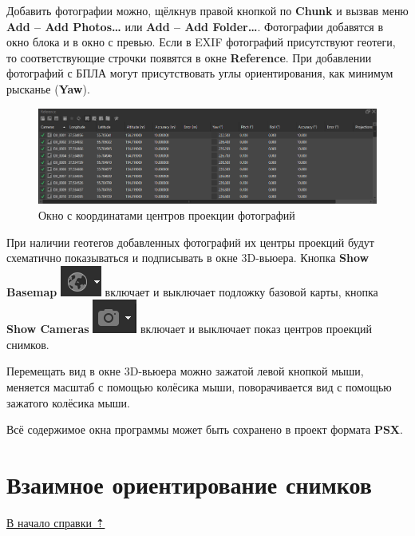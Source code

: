 \documentclass[
  12pt,
]{book}
\begin{document}
Добавить фотографии можно, щёлкнув правой кнопкой по \textbf{Chunk} и вызвав меню \textbf{Add -- Add Photos\ldots{}} или \textbf{Add -- Add Folder\ldots{}}. Фотографии добавятся в окно блока и в окно с превью. Если в EXIF фотографий присутствуют геотеги, то соответствующие строчки появятся в окне \textbf{Reference}. При добавлении фотографий с БПЛА могут присутствовать углы ориентирования, как минимум рысканье (\textbf{Yaw}).

\begin{figure}
\centering
\includegraphics{images/Ref18/Reference.png}
\caption{Окно с координатами центров проекции фотографий}
\end{figure}

При наличии геотегов добавленных фотографий их центры проекций будут схематично показываться и подписывать в окне 3D-вьюера. Кнопка \textbf{Show Basemap} \includegraphics{images/Ref18/Basemap.png} включает и выключает подложку базовой карты, кнопка \textbf{Show Cameras} \includegraphics{images/Ref18/Cameras.png} включает и выключает показ центров проекций снимков.

Перемещать вид в окне 3D-вьюера можно зажатой левой кнопкой мыши, меняется масштаб с помощью колёсика мыши, поворачивается вид с помощью зажатого колёсика мыши.

Всё содержимое окна программы может быть сохранено в проект формата \textbf{PSX}.

\hypertarget{agisoft-alignment}{%
\section{Взаимное ориентирование снимков}\label{agisoft-alignment}}

\protect\hyperlink{agisoft}{В начало справки ⇡}
\end{document}

